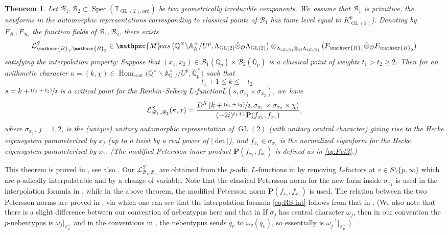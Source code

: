 \documentclass[JEP,XML,SOM,Unicode,published]{cedram}
\newcommand{\psfrac}[2]{\sfrac{(#1)}{#2}}
\newcommand{\Lfunction}{$L$\nobreakdash-func\-tion\xspace}
\newcommand{\Lfunctions}{$L$\nobreakdash-func\-tions\xspace}
\theoremstyle{plain}
\newtheorem{thm}{Theorem}[subsection]
\theoremstyle{remark}
\newcommand{\bA}{\mathbb{A}}
\newcommand{\bQ}{\mathbb{Q}}
\newcommand{\bT}{\mathbb{T}}
\newcommand{\bZ}{\mathbb{Z}}
\newcommand{\cL}{\mathcal{L}}
\newcommand{\cO}{\mathcal{O}}
\newcommand{\sB}{\mathscr{B}}
\newcommand{\bfP}{\mathbf{P}}
\DeclareMathOperator{\GL}{GL}
\newcommand{\Meas}{\mathpzc{M}\mkern-2mu eas}
\newcommand{\cont}{\mathrm{cont}}
\newcommand{\ord}{\mathrm{ord}}
\DeclareMathOperator{\Hom}{Hom}
\DeclareMathOperator{\Spec}{Spec}
\begin{document}
\begin{thm}\label{thm:Rankin}
Let $\sB_1,\sB_2\subset \Spec(\bT_{\GL(2),\ord})$ be two geometrically irreducible components. We~assume that $\sB_1$ is {\it primitive}, \ie the newforms in the automorphic representations corresponding to classical points of $\sB_1$ has tame level equal to $K^p_{\GL(2)}$). Denoting by $F_{\sB_1},F_{\sB_2}$ the function fields of $\sB_1,\sB_2$, there exists
\[
\cL^S_{\sB_1,\sB_2}\in \Meas\left(\bQ^\times\backslash\bA^\times_\bA/U^p,\Lambda_{\GL(2)}\hat{\otimes}_\cO\Lambda_{\GL(2)}\right)\otimes_{\Lambda_{\GL(2)}\hat{\otimes}_\cO\Lambda_{\GL(2)}} (F_{\sB_1}\hat{\otimes}_\cO F_{\sB_2})
\]
satisfying the interpolation property: Suppose that $(x_1,x_2)\in \sB_1(\bar{\bQ}_p)\times\sB_2(\bar{\bQ}_p)$ is a classical point of weights $t_1> t_2\geq 2$. Then for an arithmetic character $\kappa=(k,\chi)\in \Hom_\cont\bigl(\bQ^\times\backslash\bA^\times_{\bQ,f}/U^p,\bar{\bQ}^\times_p\bigr)$ such that
\[
-t_1+1\leq k\leq -t_2
\]
\ie $s=k+\psfrac{t_1+t_2}{2}$ is a critical point for the Rankin--Selberg \Lfunction \hbox{$L(s,\sigma_{x_1}\times\sigma_{x_2})$}, we~have
\begin{align}
\label{eq:RS-int} \cL^S_{\sB_1,\sB_2}(\kappa,x)=\frac{D^S\left(k+\psfrac{t_1+t_2}{2},\sigma_{x_1}\times\sigma_{x_2}\times\chi\right)}{ (-2i)^{t_1+1}\bfP(f_{x_1},f_{x_1})},
\end{align}
where $\sigma_{x_j}$, $j=1,2$, is the (unique) unitary automorphic representation of $\GL(2)$ (with unitary central character) giving rise to the Hecke eigensystem parameterized by $x_j$ (up to a twist by a real power of $|\det|$), and $f_{x_1}\in\sigma_{x_1}$ is the normalized eigenform for the Hecke eigensystem parameterized by $x_1$. (The modified Petersson inner product $\bfP(f_{x_1},f_{x_1})$ is defined as in \eqref{eq:Pet2}.)
\end{thm}

This theorem is proved in \cite[Th.\,5.1d]{Hi88}, see also \cite[Th.\,A]{Chen-Hsieh}. Our $\cL^S_{\sB_1,\sB_2}$ are obtained from the $p$-adic \Lfunctions in \loccit by removing $L$-factors at $v\in S\setminus\{p,\infty\}$ which are $p$-adically interpolatable and by a change of variable. Note that the classical Petersson norm for the new form inside $\sigma_{x_1}$ is used in the interpolation formula in \loccit, while in the above theorem, the modified Petersson norm $\bfP(f_{x_1},f_{x_1})$ is used. The relation between the two Petersson norms are proved in \cite[Lem.\,3.6]{HsiehTriple}, via which one can see that the interpolation formula \eqref{eq:RS-int} follows from that in \cite{Hi88,Chen-Hsieh}. (We also note that there is a slight difference between our convention of nebentypus here and that in \loccit If $\sigma_j$ has central character $\omega_j$, then in our convention the $p$-nebentypus is $\omega_j|_{\bZ^\times_p}$ and in the conventions in \loccit, the nebentypus sends $q_v$ to $\omega_v(q_v)$, so essentially is $\omega^{-1}_j|_{\bZ^\times_p}$.)
\end{document}
